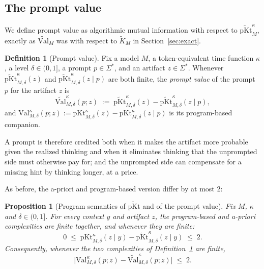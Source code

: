 \documentclass[letterpaper]{article} %
\newtheorem{proposition}[theorem]{Proposition}
\theoremstyle{definition}
\newtheorem{definition}[theorem]{Definition}
\theoremstyle{remark}
\newcommand{\Val}{\mathrm{Val}}
\newcommand{\pKt}{\mathrm{pKt}}
\newcommand{\pKtt}{\widetilde{\pKt}}
\begin{document}
\subsection{The prompt value}\label{sec:value}
We define prompt value as  algorithmic mutual information with respect to
$\pKtt^{\kappa}_M$, exactly as $\widetilde{\Val}_M$ was with respect to
$\widetilde K_M$ in Section~\ref{sec:exact}.

\begin{definition}[Prompt value]\label{def:medval}
Fix a model $M$, a token-equivalent time function $\kappa$, a level
$\delta\in(0,1]$, a prompt $p\in\Sigma^*$, and an artifact $z\in\Sigma^*$. Whenever
$\pKtt^{\kappa}_{M,\delta}(z)$ and $\pKtt^{\kappa}_{M,\delta}(z \mid p)$ are
both finite, the \emph{prompt value} of the prompt $p$ for the artifact $z$
is
\begin{equation}\label{eq:valdef}
\widetilde{\Val}^{\kappa}_{M,\delta}(p; z) \;:=\;
\pKtt^{\kappa}_{M,\delta}(z) - \pKtt^{\kappa}_{M,\delta}(z \mid p) ,
\end{equation}
and $\Val^{\kappa}_{M,\delta}(p;z) := \pKt^{\kappa}_{M,\delta}(z)
- \pKt^{\kappa}_{M,\delta}(z \mid p)$ is its program-based companion. 
\end{definition}

A prompt is therefore credited both when it makes the artifact more probable
given the realized thinking and when it eliminates thinking that the unprompted
side must otherwise pay for; and the unprompted side can compensate for a
missing hint by thinking longer, at a price.

As before, the a-priori and program-based version differ by at most 2:
\begin{proposition}[Program semantics of $\pKtt$ and of the prompt value]
\label{prop:pkt-semantics}
Fix $M$, $\kappa$ and $\delta\in(0,1]$. For every context $y$ and artifact $z$, the
program-based and a-priori complexities are finite together, and whenever they are finite:
\[
0 \;\le\; \pKt^{\kappa}_{M,\delta}(z \mid y)
- \pKtt^{\kappa}_{M,\delta}(z \mid y) \;\le\; 2 .
\]
Consequently, whenever the two complexities of Definition~\ref{def:medval} are
finite,
\[
\bigl| \Val^{\kappa}_{M,\delta}(p;z)
- \widetilde{\Val}^{\kappa}_{M,\delta}(p;z) \bigr| \;\le\; 2 .
\]
\end{proposition}
\end{document}
